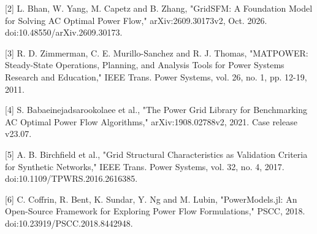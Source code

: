 \documentclass[conference]{IEEEtran}
\begin{document}
[2] L. Bhan, W. Yang, M. Capetz and B. Zhang, "GridSFM: A Foundation Model for Solving AC Optimal Power Flow," arXiv:2609.30173v2, Oct. 2026. doi:10.48550/arXiv.2609.30173.

[3] R. D. Zimmerman, C. E. Murillo-Sanchez and R. J. Thomas, "MATPOWER: Steady-State Operations, Planning, and Analysis Tools for Power Systems Research and Education," IEEE Trans. Power Systems, vol. 26, no. 1, pp. 12-19, 2011.

[4] S. Babaeinejadsarookolaee et al., "The Power Grid Library for Benchmarking AC Optimal Power Flow Algorithms," arXiv:1908.02788v2, 2021. Case release v23.07.

[5] A. B. Birchfield et al., "Grid Structural Characteristics as Validation Criteria for Synthetic Networks," IEEE Trans. Power Systems, vol. 32, no. 4, 2017. doi:10.1109/TPWRS.2016.2616385.

[6] C. Coffrin, R. Bent, K. Sundar, Y. Ng and M. Lubin, "PowerModels.jl: An Open-Source Framework for Exploring Power Flow Formulations," PSCC, 2018. doi:10.23919/PSCC.2018.8442948.
\end{document}
